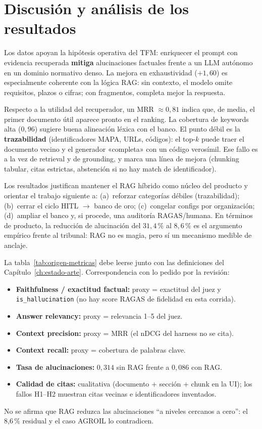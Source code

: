 \section{Discusión y análisis de los resultados}
Los datos apoyan la hipótesis operativa del TFM: enriquecer el prompt con evidencia recuperada \textbf{mitiga} alucinaciones factuales frente a un LLM autónomo en un dominio normativo denso. La mejora en exhaustividad ($+1{,}60$) es especialmente coherente con la lógica RAG: sin contexto, el modelo omite requisitos, plazos o cifras; con fragmentos, completa mejor la respuesta.

Respecto a la utilidad del recuperador, un MRR $\approx 0{,}81$ indica que, de media, el primer documento útil aparece pronto en el ranking. La cobertura de keywords alta ($0{,}96$) sugiere buena alineación léxica con el banco. El punto débil es la \textbf{trazabilidad} (identificadores MAPA, URLs, códigos): el top-$k$ puede traer el documento vecino y el generador «completa» con un código verosímil. Ese fallo es a la vez de retrieval y de grounding, y marca una línea de mejora (chunking tabular, citas estrictas, abstención si no hay match de identificador).

Los resultados justifican mantener el RAG híbrido como núcleo del producto y orientar el trabajo siguiente a: (a)~reforzar categorías débiles (trazabilidad); (b)~cerrar el ciclo HITL $\rightarrow$ banco de oro; (c)~congelar configs por organización; (d)~ampliar el banco y, si procede, una auditoría RAGAS/humana. En términos de producto, la reducción de alucinación del $31{,}4\,\%$ al $8{,}6\,\%$ es el argumento empírico frente al tribunal: RAG no es magia, pero sí un mecanismo medible de anclaje.

La tabla~\ref{tab:origen-metricas} debe leerse junto con las definiciones del Capítulo~\ref{ch:estado-arte}. Correspondencia con lo pedido por la revisión:

\begin{itemize}
  \item \textbf{Faithfulness / exactitud factual:} proxy = exactitud del juez y \texttt{is\_hallucination} (no hay score RAGAS de fidelidad en esta corrida).
  \item \textbf{Answer relevancy:} proxy = relevancia 1--5 del juez.
  \item \textbf{Context precision:} proxy = MRR (el nDCG del harness no se cita).
  \item \textbf{Context recall:} proxy = cobertura de palabras clave.
  \item \textbf{Tasa de alucinaciones:} $0{,}314$ sin RAG frente a $0{,}086$ con RAG.
  \item \textbf{Calidad de citas:} cualitativa (documento + sección + chunk en la UI); los fallos H1--H2 muestran citas vecinas e identificadores inventados.
\end{itemize}

No se afirma que RAG reduzca las alucinaciones ``a niveles cercanos a cero'': el 8{,}6\,\% residual y el caso AGROIL lo contradicen.
